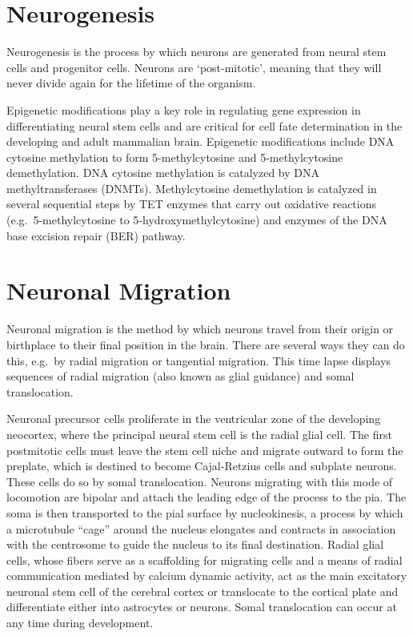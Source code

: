 \hypertarget{neurogenesis}{%
\section{Neurogenesis}\label{neurogenesis}}

Neurogenesis is the process by which neurons are generated from neural stem cells and progenitor cells. Neurons are `post-mitotic', meaning that they will never divide again for the lifetime of the organism.

Epigenetic modifications play a key role in regulating gene expression in differentiating neural stem cells and are critical for cell fate determination in the developing and adult mammalian brain. Epigenetic modifications include DNA cytosine methylation to form 5-methylcytosine and 5-methylcytosine demethylation. DNA cytosine methylation is catalyzed by DNA methyltransferases (DNMTs). Methylcytosine demethylation is catalyzed in several sequential steps by TET enzymes that carry out oxidative reactions (e.g.~5-methylcytosine to 5-hydroxymethylcytosine) and enzymes of the DNA base excision repair (BER) pathway.

\hypertarget{neuronal-migration}{%
\section{Neuronal Migration}\label{neuronal-migration}}

Neuronal migration is the method by which neurons travel from their origin or birthplace to their final position in the brain. There are several ways they can do this, e.g.~by radial migration or tangential migration. This time lapse displays sequences of radial migration (also known as glial guidance) and somal translocation.

Neuronal precursor cells proliferate in the ventricular zone of the developing neocortex, where the principal neural stem cell is the radial glial cell. The first postmitotic cells must leave the stem cell niche and migrate outward to form the preplate, which is destined to become Cajal-Retzius cells and subplate neurons. These cells do so by somal translocation. Neurons migrating with this mode of locomotion are bipolar and attach the leading edge of the process to the pia. The soma is then transported to the pial surface by nucleokinesis, a process by which a microtubule ``cage'' around the nucleus elongates and contracts in association with the centrosome to guide the nucleus to its final destination. Radial glial cells, whose fibers serve as a scaffolding for migrating cells and a means of radial communication mediated by calcium dynamic activity, act as the main excitatory neuronal stem cell of the cerebral cortex or translocate to the cortical plate and differentiate either into astrocytes or neurons. Somal translocation can occur at any time during development.

